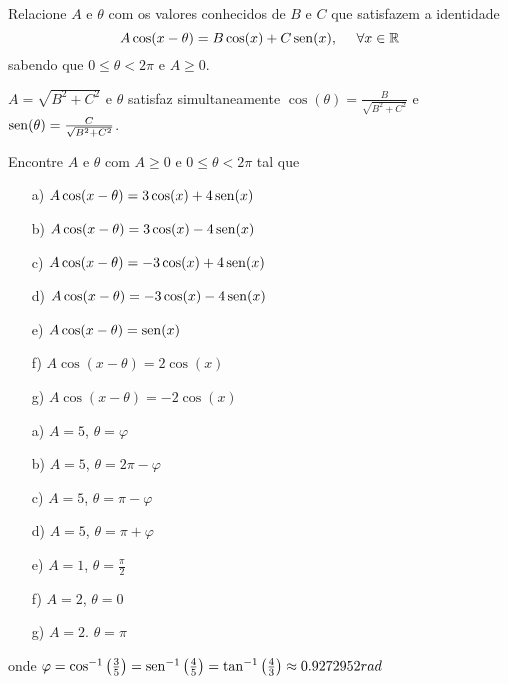 \begin{Exercise}
Relacione $A$ e $\theta$ com os valores conhecidos de $B$ e $C$ que satisfazem a identidade
$$A\cos(x-\theta)=B\cos(x)+C\operatorname{sen}(x),~~~~\forall x\in\mathbb{R}$$
sabendo que $0\leq \theta<2\pi$ e $A\geq 0$.
\end{Exercise}
\begin{Answer}
$A=\sqrt{B^2+C^2}$ e $\theta$ satisfaz simultaneamente $\cos(\theta)=\frac{B}{\sqrt{B^2+C^2}}$ e $\operatorname{sen}(\theta)=\frac{C}{\sqrt{B^2+C^2}}$.
\end{Answer}
\begin{Exercise} Encontre $A$ e $\theta$ com $A\geq 0$ e  $0\leq \theta<2\pi$ tal que
\begin{itemize}
 \item [a)] $A\cos(x-\theta)=3\cos(x)+4\operatorname{sen}(x)$
 \item [b)] $A\cos(x-\theta)=3\cos(x)-4\operatorname{sen}(x)$
 \item [c)] $A\cos(x-\theta)=-3\cos(x)+4\operatorname{sen}(x)$
 \item [d)] $A\cos(x-\theta)=-3\cos(x)-4\operatorname{sen}(x)$
 \item [e)] $A\cos(x-\theta)=\operatorname{sen}(x)$
 \item [f)] $A\cos(x-\theta)=2\cos(x)$
 \item [g)] $A\cos(x-\theta)=-2\cos(x)$
 \end{itemize}
\end{Exercise}
\begin{Answer}
\begin{itemize}
 \item [a)] $A=5$, $\theta=\varphi$
 \item [b)] $A=5$, $\theta=2\pi-\varphi$
 \item [c)] $A=5$, $\theta=\pi-\varphi$
 \item [d)] $A=5$, $\theta=\pi+\varphi$
 \item [e)] $A=1$, $\theta=\frac{\pi}{2}$
 \item [f)] $A=2$, $\theta=0$
 \item [g)] $A=2$. $\theta=\pi$
 \end{itemize}
 onde $\varphi=\cos^{-1}\left(\frac{3}{5}\right)=\operatorname{sen}^{-1}\left(\frac{4}{5}\right)=\tan^{-1}\left(\frac{4}{3}\right)\approx 0.9272952rad $
\end{Answer}



